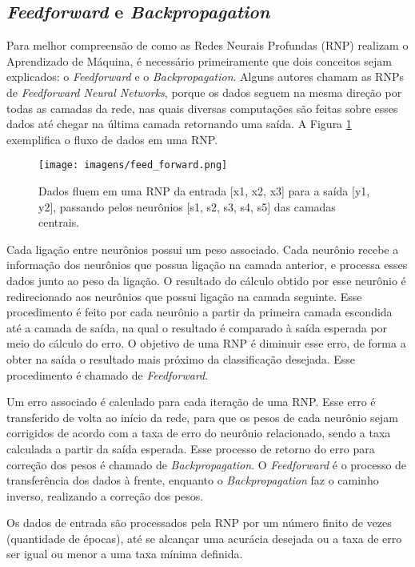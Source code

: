 \documentclass[
12pt,				%
openright,			%
oneside,			%
a4paper,			%
english,			%
french,				%
spanish,			%
brazil				%
]{abntex2}
\begin{document}
\subsection{\textit{Feedforward} e \textit{Backpropagation}} \label{feed_back}

Para melhor compreensão de como as Redes Neurais Profundas (RNP) realizam o Aprendizado de Máquina, é necessário primeiramente que dois conceitos sejam explicados: o \textit{Feedforward} e o \textit{Backpropagation}. Alguns autores chamam as RNPs de \textit{Feedforward Neural Networks}, porque os dados seguem na mesma direção por todas as camadas da rede, nas quais diversas computações são feitas sobre esses dados até chegar na última camada retornando uma saída. A Figura \ref{fig:feed_forward} exemplifica o fluxo de dados em uma RNP.

\begin{figure}[ht]
\centering
\caption{Dados fluem em uma RNP da entrada [x1, x2, x3] para a saída [y1, y2], passando pelos neurônios [s1, s2, s3, s4, s5] das camadas centrais.}
\texttt{[image: imagens/feed\_forward.png]}
\label{fig:feed_forward}
\end{figure}

Cada ligação entre neurônios possui um peso associado. Cada neurônio recebe a informação dos neurônios que possua ligação na camada anterior, e processa esses dados junto ao peso da ligação. O resultado do cálculo obtido por esse neurônio é redirecionado aos neurônios que possui ligação na camada seguinte. Esse procedimento é feito por cada neurônio a partir da primeira camada escondida até a camada de saída, na qual o resultado é comparado à saída esperada por meio do cálculo do erro. O objetivo de uma RNP é diminuir esse erro, de forma a obter na saída o resultado mais próximo da classificação desejada. Esse procedimento é chamado de \textit{Feedforward}.

Um erro associado é calculado para cada iteração de uma RNP. Esse erro é transferido de volta ao início da rede, para que os pesos de cada neurônio sejam corrigidos de acordo com a taxa de erro do neurônio relacionado, sendo a taxa calculada a partir da saída esperada. Esse processo de retorno do erro para correção dos pesos é chamado de \textit{Backpropagation}. O \textit{Feedforward} é o processo de transferência dos dados à frente, enquanto o \textit{Backpropagation} faz o caminho inverso, realizando a correção dos pesos.

Os dados de entrada são processados pela RNP por um número finito de vezes (quantidade de épocas), até se alcançar uma acurácia desejada ou a taxa de erro ser igual ou menor a uma taxa mínima definida.
\end{document}
